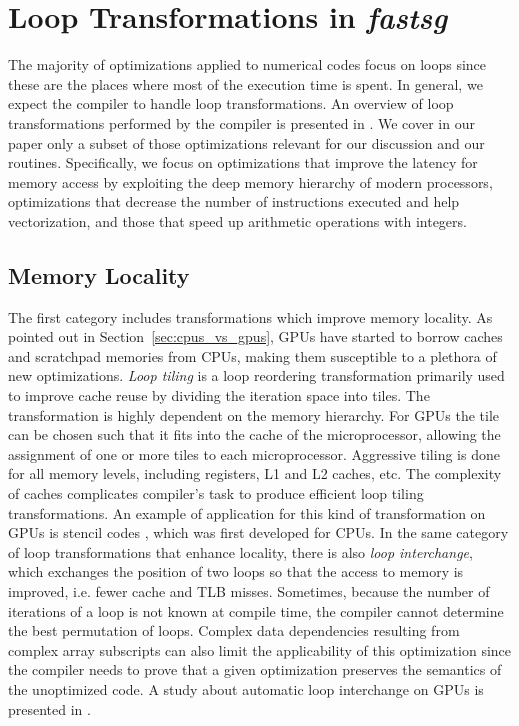 \section{Loop Transformations in \textit{fastsg}}
\label{sec:optimizations}

The majority of optimizations applied to numerical codes focus on loops since
these are the places where most of the execution time is spent. In general, we
expect the compiler to handle loop transformations. An overview of loop
transformations performed by the compiler is presented in
\cite{Bacon:1994:CTH:197405.197406}. We cover in our paper only a subset of
those optimizations relevant for our discussion and our routines. Specifically,
we focus on optimizations that improve the latency for memory access by
exploiting the deep memory hierarchy of modern processors, optimizations that
decrease the number of instructions executed and help vectorization, and those
that speed up arithmetic operations with integers.

\subsection{Memory Locality}

The first category includes transformations which improve memory locality. As
pointed out in Section~\ref{sec:cpus_vs_gpus}, GPUs have started to borrow
caches and scratchpad memories from CPUs, making them susceptible to a plethora
of new optimizations. \textit{Loop tiling} is a loop reordering transformation
primarily used to improve cache reuse by dividing the iteration space into
tiles. The transformation is highly dependent on the memory hierarchy. For GPUs
the tile can be chosen such that it fits into the cache of the microprocessor,
allowing the assignment of one or more tiles to each microprocessor. Aggressive
tiling is done for all memory levels, including registers, L1 and L2 caches,
etc. The complexity of caches complicates compiler's task to produce efficient
loop tiling transformations. An example of application for this kind of
transformation on GPUs is stencil codes \cite{volkov2010}, which was first
developed for CPUs. In the same category of loop transformations that enhance
locality, there is also \textit{loop interchange}, which exchanges the position
of two loops so that the access to memory is improved, i.e. fewer cache and TLB
misses. Sometimes, because the number of iterations of a loop is not known at
compile time, the compiler cannot determine the best permutation of loops.
Complex data dependencies resulting from complex array subscripts can also limit
the applicability of this optimization since the compiler needs to prove that a
given optimization preserves the semantics of the unoptimized code. A study
about automatic loop interchange on GPUs is presented in
\cite{Leung:2009:APG:1596655.1596670}.


